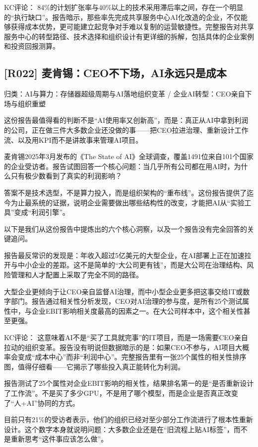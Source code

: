 \documentclass[11pt]{ctexart}
\begin{document}
KC评论： 84\%的计划扩张率与40\%以上的技术采用滞后率之间，存在一个明显的“执行缺口”。报告暗示，那些率先完成共享服务中心AI化改造的企业，不仅能够获得成本优势，更可能建立起竞争对手难以复制的运营敏捷性。完整报告对共享服务中心的转型路径、技术选择和组织设计有更详细的拆解，包括具体的企业案例和投资回报测算。

\subsection{[R022] 麦肯锡：CEO不下场，AI永远只是成本}
{\small\color{refgray}归类：AI与算力：存储器超级周期与AI落地组织变革 / 企业AI转型：CEO亲自下场与组织重塑}

这份报告最值得看的判断不是“AI使用率又创新高”，而是：真正从AI中拿到利润的公司，正在做三件大多数企业还没做的事——把CEO拉进治理、重新设计工作流、以及用KPI而不是讲故事来管理AI项目。

麦肯锡2025年3月发布的《The State of AI》全球调查，覆盖1491位来自101个国家的企业受访者。报告试图回答一个核心问题：当几乎所有公司都在用AI时，为什么只有极少数看到了真实的利润影响？

答案不是技术选型，不是算力投入，而是组织架构的“重布线”。这份报告提供了迄今为止最系统的证据，说明企业需要做出哪些结构性的改变，才能把AI从“实验工具”变成“利润引擎”。

以下是我们从这份报告中提炼出的六个核心洞察，以及一个报告没有完全回答的关键追问。

报告最反常识的发现是：年收入超过5亿美元的大型企业，在AI部署上正在加速拉开与中小企业的差距。这不是简单的“大公司更有钱”，而是大公司在治理结构、风险管理和人才配置上采取了完全不同的路径。

大型企业更倾向于让CEO亲自监督AI治理，而中小型企业更多把这事交给IT或数字部门。报告通过相关性分析发现，CEO对AI治理的参与度，是所有25个测试属性中，与企业EBIT影响相关度最高的因素之一。在大公司样本中，这个相关性甚至更强。

KC评论： 这意味着AI不是“买了工具就完事”的IT项目，而是一场需要CEO亲自拉动的组织变革。报告没有明说但数据暗示的是：如果CEO不参与，AI项目大概率会变成“成本中心”而非“利润中心”。完整报告里有一张25个属性的相关性排序图，值得仔细看——它揭示了哪些投入真正能转化为利润。

报告测试了25个属性对企业EBIT影响的相关性，结果排名第一的是“是否重新设计了工作流”。不是买了多少GPU，不是用了哪个模型，而是企业是否真正改变了“人+AI”协同的方式。

目前只有21\%的受访者表示，他们的组织已经对至少部分工作流进行了根本性重新设计。这个数字本身就说明问题：大多数企业还是在“旧流程上贴AI标签”，而不是重新思考“这件事应该怎么做”。
\end{document}
